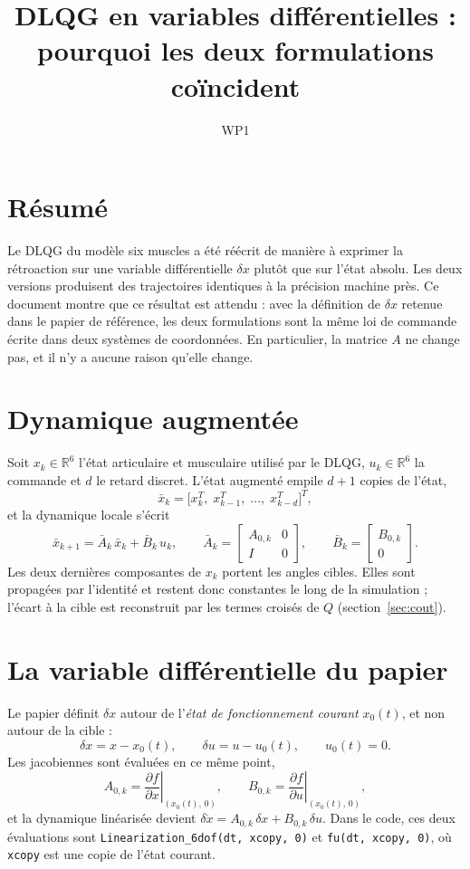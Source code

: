 \documentclass[11pt,a4paper]{article}
\title{DLQG en variables différentielles :\\ pourquoi les deux formulations coïncident}
\author{WP1}
\date{}
\begin{document}
\maketitle

\section*{Résumé}
Le DLQG du modèle six muscles a été réécrit de manière à exprimer la rétroaction sur une
variable différentielle $\delta x$ plutôt que sur l'état absolu. Les deux versions produisent
des trajectoires identiques à la précision machine près. Ce document montre que ce résultat
est attendu : avec la définition de $\delta x$ retenue dans le papier de référence, les deux
formulations sont la même loi de commande écrite dans deux systèmes de coordonnées. En
particulier, la matrice $A$ ne change pas, et il n'y a aucune raison qu'elle change.

\section{Dynamique augmentée}
Soit $x_k\in\mathbb{R}^{6}$ l'état articulaire et musculaire utilisé par le DLQG,
$u_k\in\mathbb{R}^{6}$ la commande et $d$ le retard discret. L'état augmenté empile $d+1$ copies
de l'état,
\[
 \bar x_k=\big[x_k^T,\;x_{k-1}^T,\;\ldots,\;x_{k-d}^T\big]^T,
\]
et la dynamique locale s'écrit
\[
 \bar x_{k+1}=\bar A_k\,\bar x_k+\bar B_k\,u_k,\qquad
 \bar A_k=\begin{bmatrix}A_{0,k}&0\\I&0\end{bmatrix},\qquad
 \bar B_k=\begin{bmatrix}B_{0,k}\\0\end{bmatrix}.
\]
Les deux dernières composantes de $x_k$ portent les angles cibles. Elles sont propagées par
l'identité et restent donc constantes le long de la simulation ; l'écart à la cible est
reconstruit par les termes croisés de $Q$ (section~\ref{sec:cout}).

\section{La variable différentielle du papier}
Le papier définit $\delta x$ autour de l'\emph{état de fonctionnement courant} $x_0(t)$, et non
autour de la cible :
\[
 \delta x=x-x_0(t),\qquad \delta u=u-u_0(t),\qquad u_0(t)=0 .
\]
Les jacobiennes sont évaluées en ce même point,
\[
 A_{0,k}=\left.\frac{\partial f}{\partial x}\right|_{(x_0(t),\,0)},\qquad
 B_{0,k}=\left.\frac{\partial f}{\partial u}\right|_{(x_0(t),\,0)},
\]
et la dynamique linéarisée devient $\delta\dot x=A_{0,k}\,\delta x+B_{0,k}\,\delta u$.
Dans le code, ces deux évaluations sont \texttt{Linearization\_6dof(dt, xcopy, 0)} et
\texttt{fu(dt, xcopy, 0)}, où \texttt{xcopy} est une copie de l'état courant.
\end{document}
